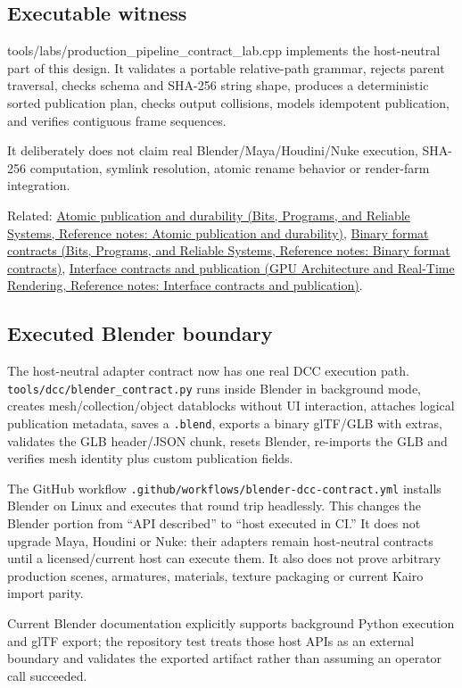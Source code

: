 \subsection{Executable witness}\label{appendix-03ade9e1875f-executable-witness}

\hypertarget{appendix-03ade9e1875f-executable-witness}{}

tools/labs/production\_pipeline\_contract\_lab.cpp implements the host-neutral part of this design. It validates a portable relative-path grammar, rejects parent traversal, checks schema and SHA-256 string shape, produces a deterministic sorted publication plan, checks output collisions, models idempotent publication, and verifies contiguous frame sequences.

It deliberately does not claim real Blender/Maya/Houdini/Nuke execution, SHA-256 computation, symlink resolution, atomic rename behavior or render-farm integration.

Related: \href{../01-Bits-Programs-and-Reliable-Systems/main.pdf\#nameddest=appendix-e89a8f290ef5}{Atomic publication and durability (Bits, Programs, and Reliable Systems, Reference notes: Atomic publication and durability)}, \href{../01-Bits-Programs-and-Reliable-Systems/main.pdf\#nameddest=appendix-590bbb2424c1}{Binary format contracts (Bits, Programs, and Reliable Systems, Reference notes: Binary format contracts)}, \href{../06-GPU-Architecture-and-Real-Time-Rendering/main.pdf\#nameddest=appendix-fdae7ff0a23f}{Interface contracts and publication (GPU Architecture and Real-Time Rendering, Reference notes: Interface contracts and publication)}.

\subsection{Executed Blender boundary}\label{appendix-03ade9e1875f-executed-blender-boundary}

\hypertarget{appendix-03ade9e1875f-executed-blender-boundary}{}

The host-neutral adapter contract now has one real DCC execution path. \texttt{tools/dcc/blender\_contract.py} runs inside Blender in background mode, creates mesh/collection/object datablocks without UI interaction, attaches logical publication metadata, saves a \texttt{.blend}, exports a binary glTF/GLB with extras, validates the GLB header/JSON chunk, resets Blender, re-imports the GLB and verifies mesh identity plus custom publication fields.

The GitHub workflow \texttt{.github/workflows/blender-dcc-contract.yml} installs Blender on Linux and executes that round trip headlessly. This changes the Blender portion from ``API described'' to ``host executed in CI.'' It does not upgrade Maya, Houdini or Nuke: their adapters remain host-neutral contracts until a licensed/current host can execute them. It also does not prove arbitrary production scenes, armatures, materials, texture packaging or current Kairo import parity.

Current Blender documentation explicitly supports background Python execution and glTF export; the repository test treats those host APIs as an external boundary and validates the exported artifact rather than assuming an operator call succeeded.
